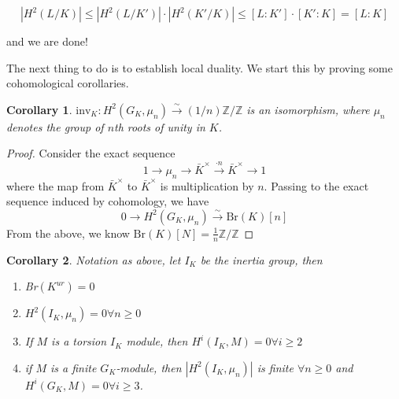 \documentclass[class=article, crop=false]{standalone}
\newtheorem{corollary}{Corollary}
\begin{document}
$$|H^2(L/K)|\leq |H^2(L/K')|\cdot|H^2(K'/K)|\leq [L:K']\cdot[K':K]=[L:K]$$

 and we are done!
 
 The next thing to do is to establish local duality. We start this by proving some cohomological corollaries. 
 
\begin{corollary}
$\text{inv}_K: H^2(G_K, \mu_n) \xrightarrow{\sim} (1/n)\mathbb{Z}/\mathbb{Z}$ is an isomorphism, where $\mu_n$ denotes the group of $n$th roots of unity in $K$.
\end{corollary}
\begin{proof}
Consider the exact sequence $$1\rightarrow \mu_n\rightarrow \bar{K}^\times\xrightarrow{\cdot n}\bar{K}^\times\rightarrow 1$$ where the map from $\bar{K}^\times$ to $\bar{K}^\times$ is multiplication by $n$. Passing to the exact sequence induced by cohomology, we have $$0\rightarrow H^2(G_K,\mu_n)\xrightarrow{\sim} \text{Br}(K)[n]$$ 
From the above, we know $\text{Br}(K)[N]=\frac{1}{n}\mathbb{Z}/\mathbb{Z}$
\end{proof}

\begin{corollary}
Notation as above, let $I_K$ be the inertia group, then
\begin{enumerate}
    \item Br$(K^{ur})=0$
    \item $H^2(I_K,\mu_n)=0\forall n\geq 0$
    \item If $M$ is a torsion $I_K$ module, then $H^i(I_K, M)=0\forall i\geq 2$
    \item if $M$ is a finite $G_K$-module, then $|H^2(I_K,\mu_n)|$ is finite $\forall n\geq 0$ and $H^i(G_K, M)=0\forall i\geq 3$.
\end{enumerate}
\end{corollary}
\end{document}
